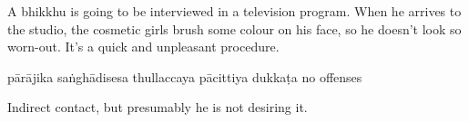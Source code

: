 \begin{exam}{\autoExamName}
\begin{problem*}
\begin{parts}
  \bigskip

  \item A bhikkhu is going to be interviewed in a television program. When he
    arrives to the studio, the cosmetic girls brush some colour on his face, so he
    doesn't look so worn-out. It's a quick and unpleasant procedure.

  \bigskip

  \begin{answers}{6}
    \bChoices
     pārājika\eAns
     saṅghādisesa\eAns
     thullaccaya\eAns
     pācittiya\eAns
     dukkaṭa\eAns
     no offenses\eAns
    \eChoices
  \end{answers}

  \begin{solution}
    Indirect contact, but presumably he is not desiring it.
  \end{solution}

  \end{parts}

\end{problem*}

\end{exam}
